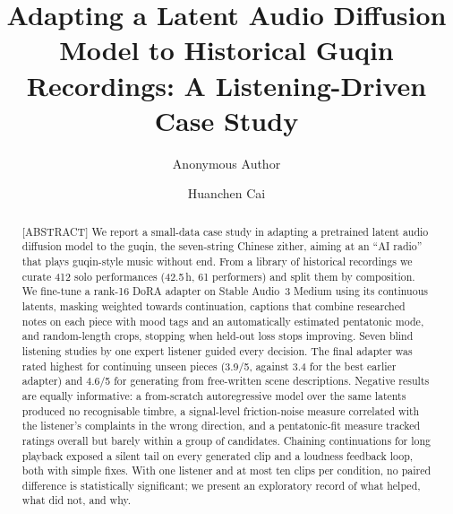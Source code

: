 \documentclass[ProofPDF]{./Styles/Jnls-Template-V3}
\begin{document}
\def\MSFirstPage{\pageref{startPage_Label}}
\def\MSLastPage{\pageref{endPage_Label}}
\graphicspath{{../generated/}}
\label{startPage_Label}
\title{Adapting a Latent Audio Diffusion Model to Historical Guqin Recordings: A Listening-Driven Case Study}


\ifdefined\anonymous
\author[1]{Anonymous Author}
\else
\author[1]{Huanchen Cai}
\fi
{}

\begin{history}
\end{history}

\begin{abstract}[ABSTRACT]
We report a small-data case study in adapting a pretrained latent audio diffusion model to the guqin, the
seven-string Chinese zither, aiming at an ``AI radio'' that plays guqin-style music without end. From a library
of historical recordings we curate 412 solo performances (42.5\,h, 61 performers) and split them by composition.
We fine-tune a rank-16 DoRA adapter on Stable Audio~3 Medium using its continuous latents, masking weighted
towards continuation, captions that combine researched notes on each piece with mood tags and an automatically
estimated pentatonic mode, and random-length crops, stopping when held-out loss stops improving. Seven blind
listening studies by one expert listener guided every decision. The final adapter was rated highest for
continuing unseen pieces (3.9/5, against 3.4 for the best earlier adapter) and 4.6/5 for generating from
free-written scene descriptions. Negative results are equally informative: a from-scratch autoregressive model
over the same latents produced no recognisable timbre, a signal-level friction-noise measure correlated with the
listener's complaints in the wrong direction, and a pentatonic-fit measure tracked ratings overall but barely
within a group of candidates. Chaining continuations for long playback exposed a silent tail on every generated
clip and a loudness feedback loop, both with simple fixes. With one listener and at most ten clips per condition,
no paired difference is statistically significant; we present an exploratory record of what helped, what did
not, and why.
\end{abstract}
\end{document}
